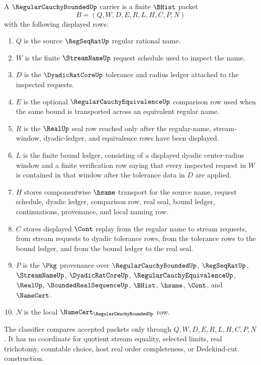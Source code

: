\begin{definition}
\label{def:regularcauchybounded-carrier}
A $\RegularCauchyBoundedUp$ carrier is a finite $\BHist$ packet
$$
B=(Q,W,D,E,R,L,H,C,P,N)
$$
with the following displayed rows:
\begin{enumerate}
\item $Q$ is the source $\RegSeqRatUp$ regular rational name.
\item $W$ is the finite $\StreamNameUp$ request schedule used to inspect the name.
\item $D$ is the $\DyadicRatCoreUp$ tolerance and radius ledger attached to the inspected requests.
\item $E$ is the optional $\RegularCauchyEquivalenceUp$ comparison row used when the same bound is transported across an equivalent regular name.
\item $R$ is the $\RealUp$ seal row reached only after the regular-name, stream-window, dyadic-ledger, and equivalence rows have been displayed.
\item $L$ is the finite bound ledger, consisting of a displayed dyadic center-radius window and a finite verification row saying that every inspected request in $W$ is contained in that window after the tolerance data in $D$ are applied.
\item $H$ stores componentwise $\hsame$ transport for the source name, request schedule, dyadic ledger, comparison row, real seal, bound ledger, continuations, provenance, and local naming row.
\item $C$ stores displayed $\Cont$ replay from the regular name to stream requests, from stream requests to dyadic tolerance rows, from the tolerance rows to the bound ledger, and from the bound ledger to the real seal.
\item $P$ is the $\Pkg$ provenance over $\RegularCauchyBoundedUp$, $\RegSeqRatUp$, $\StreamNameUp$, $\DyadicRatCoreUp$, $\RegularCauchyEquivalenceUp$, $\RealUp$, $\BoundedRealSequenceUp$, $\BHist$, $\hsame$, $\Cont$, and $\NameCert$.
\item $N$ is the local $\NameCert_{\RegularCauchyBoundedUp}$ row.
\end{enumerate}
The classifier compares accepted packets only through $Q,W,D,E,R,L,H,C,P,N$. It has no coordinate for quotient stream equality, selected limits, real trichotomy, countable choice, host real order completeness, or Dedekind-cut construction.
\end{definition}

